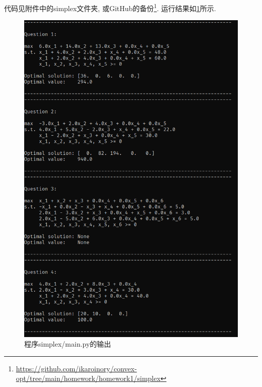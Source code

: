 代码见附件中的simplex文件夹, 或GitHub的备份\footnote{
    \href{https://github.com/ikaroinory/convex-opt/tree/main/homework/homework1/simplex}{https://github.com/ikaroinory/convex-opt/tree/main/homework/homework1/simplex}
}.
运行结果如\cref{figure:14-1}所示.

\begin{figure}
    \centering
    \includegraphics[width=\textwidth]{figures/14-1.png}
    \caption{程序simplex/main.py的输出}
    \label{figure:14-1}
\end{figure}
